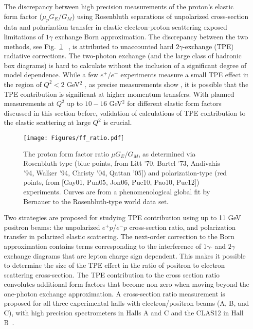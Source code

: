 The discrepancy between high precision measurements of the proton's elastic form factor ($\mu_pG_E/G_M$) using  Rosenbluth separations of unpolarized cross-section data and polarization transfer in elastic electron-proton scattering exposed limitations of $1\gamma$ exchange Born approximation. The discrepancy between the two methods, see Fig.~\ref{fig:tpe}
~\cite{Accardi:2020swt}, is attributed to unaccounted hard $2\gamma$-exchange (TPE) radiative corrections. The two-photon exchange (and the large class of hadronic box diagrams) is hard to calculate without the inclusion of a significant degree of model dependence. While a few $e^+/e^-$ experiments measure a small TPE effect in the region of $Q^2<2$ GeV$^2$ \cite{Arrington:2004tpe,vepp3:2015tpe,clas:2015tpe,olympus:2017tpe,clas:2017tpe}, as precise measurements show \cite{Christy:2021snt}, it is possible that the TPE contribution is significant at higher momentum transfers. With planned measurements at $Q^2$ up to $10-16$ GeV$^2$ for different elastic form factors discussed in this section before, validation of calculations of TPE contribution to the elastic scattering at large $Q^2$ is crucial.  

\begin{figure}
\begin{center}
\texttt{[image: Figures/ff\_ratio.pdf]}
\caption{The proton form factor ratio $\mu G_E/G_M$, as determined via Rosenbluth-type (blue points, from Litt '70\cite{Lit70}, Bartel '73\cite{Bar73}, Andivahis '94\cite{And94}, Walker '94\cite{Wal94}, Christy '04\cite{Chr04}, Qattan '05\cite{Qat05}]) and polarization-type (red points, from [Gay01\cite{Gay01}, Pun05\cite{Pun05}, Jon06\cite{Jon06}, Puc10\cite{Puc10}, Pao10\cite{Pao10}, Puc12]) experiments. Curves are from a phenomenological global fit by Bernauer \cite{Ber14} to the Rosenbluth-type world data set.}
\label{fig:tpe} 
\end{center}
\end{figure}

Two strategies are proposed for studying TPE contribution using up to 11 GeV positron beams: the unpolarized $e^+p$/$e^-p$ cross-section ratio, and polarization transfer in polarized elastic scattering.  The next-order correction to the Born approximation contains terms corresponding to the interference of $1\gamma$- and $2\gamma$ exchange diagrams that are lepton charge sign dependent. This makes it possible to determine the size of the TPE effect in the ratio of positron to electron scattering cross-section.
The TPE contribution to the cross section ratio convolutes additional form-factors that become non-zero when moving beyond the one-photon exchange approximation. A cross-section ratio measurement is proposed for all three experimental halls with electron/positron beams (A, B, and C), with high precision spectrometers in Halls A and C \cite{AY:2021,CBS:2021} and the CLAS12 in Hall B~\cite{BBCSS:2021}.

